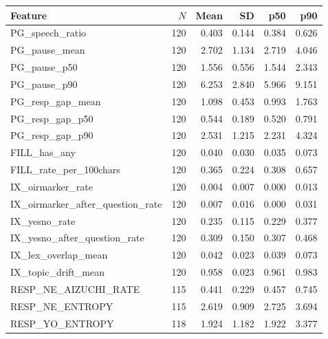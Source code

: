 \begin{tabular}{lrrrrr}
\toprule
Feature & $N$ & Mean & SD & p50 & p90 \\
\midrule
PG\_speech\_ratio & 120 & 0.403 & 0.144 & 0.384 & 0.626 \\
PG\_pause\_mean & 120 & 2.702 & 1.134 & 2.719 & 4.046 \\
PG\_pause\_p50 & 120 & 1.556 & 0.556 & 1.544 & 2.343 \\
PG\_pause\_p90 & 120 & 6.253 & 2.840 & 5.966 & 9.151 \\
PG\_resp\_gap\_mean & 120 & 1.098 & 0.453 & 0.993 & 1.763 \\
PG\_resp\_gap\_p50 & 120 & 0.544 & 0.189 & 0.520 & 0.791 \\
PG\_resp\_gap\_p90 & 120 & 2.531 & 1.215 & 2.231 & 4.324 \\
FILL\_has\_any & 120 & 0.040 & 0.030 & 0.035 & 0.073 \\
FILL\_rate\_per\_100chars & 120 & 0.365 & 0.224 & 0.308 & 0.657 \\
IX\_oirmarker\_rate & 120 & 0.004 & 0.007 & 0.000 & 0.013 \\
IX\_oirmarker\_after\_question\_rate & 120 & 0.007 & 0.016 & 0.000 & 0.031 \\
IX\_yesno\_rate & 120 & 0.235 & 0.115 & 0.229 & 0.377 \\
IX\_yesno\_after\_question\_rate & 120 & 0.309 & 0.150 & 0.307 & 0.468 \\
IX\_lex\_overlap\_mean & 120 & 0.042 & 0.023 & 0.039 & 0.073 \\
IX\_topic\_drift\_mean & 120 & 0.958 & 0.023 & 0.961 & 0.983 \\
RESP\_NE\_AIZUCHI\_RATE & 115 & 0.441 & 0.229 & 0.457 & 0.745 \\
RESP\_NE\_ENTROPY & 115 & 2.619 & 0.909 & 2.725 & 3.694 \\
RESP\_YO\_ENTROPY & 118 & 1.924 & 1.182 & 1.922 & 3.377 \\
\bottomrule
\end{tabular}

